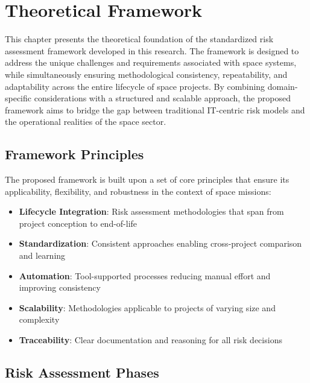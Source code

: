 \documentclass[binding=0.6cm]{sapthesis}
\begin{document}
\chapter{Theoretical Framework}
\label{ch:framework}

This chapter presents the theoretical foundation of the standardized risk assessment framework developed in this research. The framework is designed to address the unique challenges and requirements associated with space systems, while simultaneously ensuring methodological consistency, repeatability, and adaptability across the entire lifecycle of space projects. By combining domain-specific considerations with a structured and scalable approach, the proposed framework aims to bridge the gap between traditional IT-centric risk models and the operational realities of the space sector.

\section{Framework Principles}

The proposed framework is built upon a set of core principles that ensure its applicability, flexibility, and robustness in the context of space missions:

\begin{itemize}
    \item \textbf{Lifecycle Integration}: Risk assessment methodologies that span from project conception to end-of-life
    \item \textbf{Standardization}: Consistent approaches enabling cross-project comparison and learning
    \item \textbf{Automation}: Tool-supported processes reducing manual effort and improving consistency
    \item \textbf{Scalability}: Methodologies applicable to projects of varying size and complexity
    \item \textbf{Traceability}: Clear documentation and reasoning for all risk decisions
\end{itemize}

\section{Risk Assessment Phases}
\end{document}
